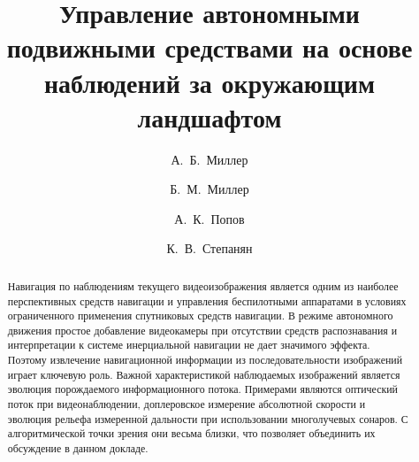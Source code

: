 \fi

\title{Управление автономными подвижными средствами на основе наблюдений за окружающим ландшафтом}
\author{А.~Б.~Миллер 
  \and  
  Б.~М.~Миллер 
  \and
  А.~К.~Попов 
  \and
  К.~В.~Степанян 
}


\maketitle

\begin{abstract}
Навигация по наблюдениям текущего видеоизображения является одним из наиболее перспективных средств навигации и управления беспилотными аппаратами в условиях ограниченного применения спутниковых средств навигации. В режиме автономного движения простое добавление видеокамеры при отсутствии средств распознавания и интерпретации к системе инерциальной навигации не дает значимого эффекта. Поэтому извлечение навигационной информации из последовательности изображений играет ключевую роль. Важной характеристикой наблюдаемых изображений является эволюция порождаемого информационного потока. Примерами являются оптический поток при видеонаблюдении, доплеровское измерение абсолютной скорости и эволюция рельефа измеренной дальности при использовании многолучевых сонаров. С алгоритмической точки
зрения они весьма близки, что позволяет объединить их обсуждение в данном докладе.

\end{abstract}

